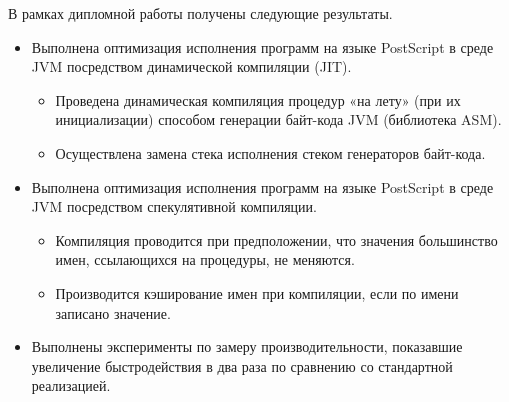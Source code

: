 \documentclass[14pt]{extarticle}
\begin{document}
	В рамках дипломной работы получены следующие результаты.
	\begin{itemize}
		\item Выполнена оптимизация исполнения программ на языке PostScript в среде JVM посредством динамической компиляции (JIT).
		\begin{itemize}
			\item Проведена динамическая компиляция процедур «на лету» (при их инициализации) способом генерации байт-кода JVM (библиотека ASM).
			\item Осуществлена замена стека исполнения стеком генераторов байт-кода.
		\end{itemize}
		\item Выполнена оптимизация исполнения программ на языке PostScript в среде JVM посредством спекулятивной компиляции.
		\begin{itemize}
			\item Компиляция проводится при предположении, что значения большинство имен, ссылающихся на процедуры, не меняются.
			\item Производится кэширование имен при компиляции, если по имени записано значение.
		\end{itemize}
		\item  Выполнены эксперименты по замеру производительности, показавшие увеличение быстродействия в два раза по сравнению со стандартной реализацией. 
	\end{itemize}
	
	\pagebreak
	
	
\end{document}
